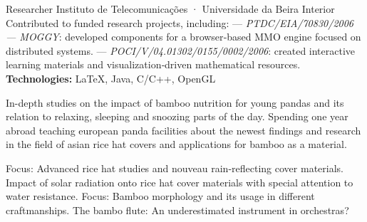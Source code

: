 \documentclass[
	a4paper,
]{fortysecondscv}
\begin{document}
\begin{cvtable}[3]
        {Researcher}
        {Instituto de Telecomunicações · Universidade da Beira Interior}
        {Contributed to funded research projects, including:
         \newline — \textit{PTDC/EIA/70830/2006 — MOGGY}: developed components for a browser‑based MMO engine focused on distributed systems.
         \newline — \textit{POCI/V/04.01302/0155/0002/2006}: created interactive learning materials and visualization‑driven mathematical resources.
         \newline \textbf{Technologies:}
         {\color{sklimegreen}LaTeX},
         {\color{skyellow}Java}, 
         {\color{skorange}C/C++}, 
         {\color{skorange}OpenGL}}
    
\end{cvtable}

\newpage
\makebacksidebar

\begin{cvtable}[1.5]
		{In-depth studies on the impact of bamboo nutrition for young pandas and
		its relation to relaxing, sleeping and snoozing parts of the day.}
		{Spending one year abroad teaching european panda facilities about the
		newest findings and research in the field of asian rice hat covers and
		applications for bamboo as a material.}
\end{cvtable}


\begin{cvtable}[1.5]
		{Focus: Advanced rice hat studies and nouveau rain-reflecting cover
		materials.}
		{Impact of solar radiation onto rice hat cover materials with special
		attention to water resistance.}
		{Focus: Bamboo morphology and its usage in different craftmanships.}
		{The bambo flute: An underestimated instrument in orchestras?}
\end{cvtable}
\end{document}
